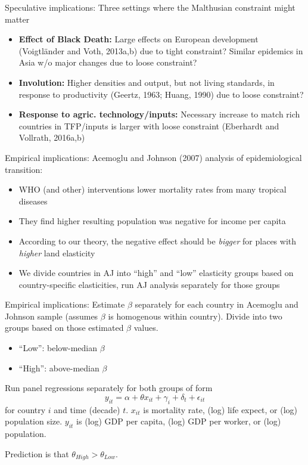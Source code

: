 \documentclass[10pt, xcolor=dvipsnames]{beamer}
\begin{document}
\begin{frame}{Speculative implications:}
Three settings where the Malthusian constraint might matter
\begin{itemize}
  \item \textbf{Effect of Black Death:} Large effects on European development (Voigtl{\"a}nder and Voth, 2013a,b) due to tight constraint? Similar epidemics in Asia w/o major changes due to loose constraint?
  \item \textbf{Involution:} Higher densities and output, but not living standards, in response to productivity (Geertz, 1963; Huang, 1990) due to loose constraint?
  \item \textbf{Response to agric. technology/inputs:} Necessary increase to match rich countries in TFP/inputs is larger with loose constraint (Eberhardt and Vollrath, 2016a,b)
\end{itemize}
\end{frame}

\begin{frame}{Empirical implications:}
Acemoglu and Johnson (2007) analysis of epidemiological transition:
\begin{itemize}
  \item WHO (and other) interventions lower mortality rates from many tropical diseases
  \item They find higher resulting population was negative for income per capita
  \item According to our theory, the negative effect should be \textit{bigger} for places with \textit{higher} land elasticity
  \item We divide countries in AJ into ``high'' and ``low'' elasticity groups based on country-specific elasticities, run AJ analysis separately for those groups
\end{itemize}

\end{frame}

\begin{frame}{Empirical implications:}
Estimate $\beta$ separately for each country in Acemoglu and Johnson sample (assumes $\beta$ is homogenous within country). Divide into two groups based on those estimated $\beta$ values.
\begin{itemize}
  \item ``Low'': below-median $\beta$
  \item ``High'': above-median $\beta$
\end{itemize}

\vspace{.25in}\noindent Run panel regressions separately for both groups of form
\begin{equation}
    y_{it} = \alpha + \theta x_{it} + \gamma_i + \delta_t + \epsilon_{it}
\end{equation}
for country $i$ and time (decade) $t$. $x_{it}$ is mortality rate, (log) life expect, or (log) population size. $y_{it}$ is (log) GDP per capita, (log) GDP per worker, or (log) population.

\vspace{.25in}\noindent Prediction is that $\theta_{High} > \theta_{Low}$.

\end{frame}
\end{document}
